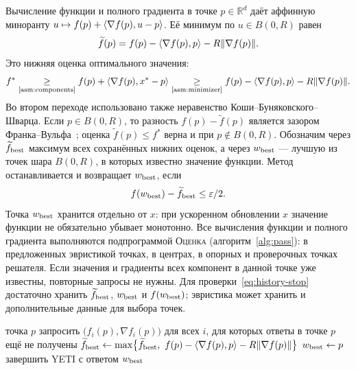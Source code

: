 Вычисление функции и полного градиента в точке $p\in\mathbb R^d$ даёт аффинную миноранту
$u\mapsto f(p)+\langle \nabla f(p),u-p\rangle$. Её минимум по $u\in B(0,R)$
равен
\begin{equation}\label{eq:history-full-lower}
 \widetilde f(p)
 =f(p)-\langle \nabla f(p),p\rangle-R\lVert\nabla f(p)\rVert.
\end{equation}
Это нижняя оценка оптимального значения:
\[
 f^\ast\mathrel{\underset{\text{\ref{asm:components}}}{\ge}} f(p)+\langle \nabla f(p),x^\ast-p\rangle
 \mathrel{\underset{\text{\ref{asm:minimizer}}}{\ge}}
 f(p)-\langle \nabla f(p),p\rangle-R\lVert\nabla f(p)\rVert.
\]
Во втором переходе использовано также неравенство Коши--Буняковского--Шварца.
Если $p\in B(0,R)$, то разность $f(p)-\widetilde f(p)$ является
зазором Франка--Вульфа~\citep{jaggi2013}; оценка $\widetilde f(p)\le f^\ast$
верна и при $p\notin B(0,R)$.
Обозначим через $\widetilde f_{\rm best}$ максимум всех сохранённых
нижних оценок, а через $w_{\rm best}$ --- лучшую из точек шара $B(0,R)$,
в которых известно значение функции. Метод останавливается и возвращает
$w_{\rm best}$, если
\begin{equation}\label{eq:history-stop}
 f(w_{\rm best})-\widetilde f_{\rm best}\le\varepsilon/2.
\end{equation}
Точка $w_{\rm best}$ хранится отдельно от $x$: при ускоренном обновлении $x$
значение функции не обязательно убывает монотонно.
Все вычисления функции и полного градиента выполняются подпрограммой \textsc{Оценка}
(алгоритм~\ref{alg:pass}): в предложенных эвристикой точках,
в центрах, в опорных и проверочных точках решателя. Если значения и градиенты всех компонент в данной точке уже
известны, повторные запросы не нужны. Для проверки~\eqref{eq:history-stop}
достаточно хранить $\widetilde f_{\rm best}$, $w_{\rm best}$
и $f(w_{\rm best})$; эвристика может хранить и дополнительные данные для выбора точек.

\begin{algorithm}[H]
\caption{\textsc{Оценка}$(p)$: вычисление функции, градиента и проверка точности}\label{alg:pass}
\begin{algorithmic}[1]
\Require точка $p$
\State запросить $\bigl(f_i(p),\nabla f_i(p)\bigr)$ для всех $i$, для которых ответы в точке $p$ ещё не получены
\State $\widetilde f_{\rm best}\gets\max\bigl\{\widetilde f_{\rm best},\ f(p)-\langle \nabla f(p),p\rangle-R\lVert\nabla f(p)\rVert\bigr\}$
 
 \State $w_{\rm best}\gets p$
\EndIf
{}
 \State завершить YETI с ответом $w_{\rm best}$
\EndIf
\end{algorithmic}
\end{algorithm}

